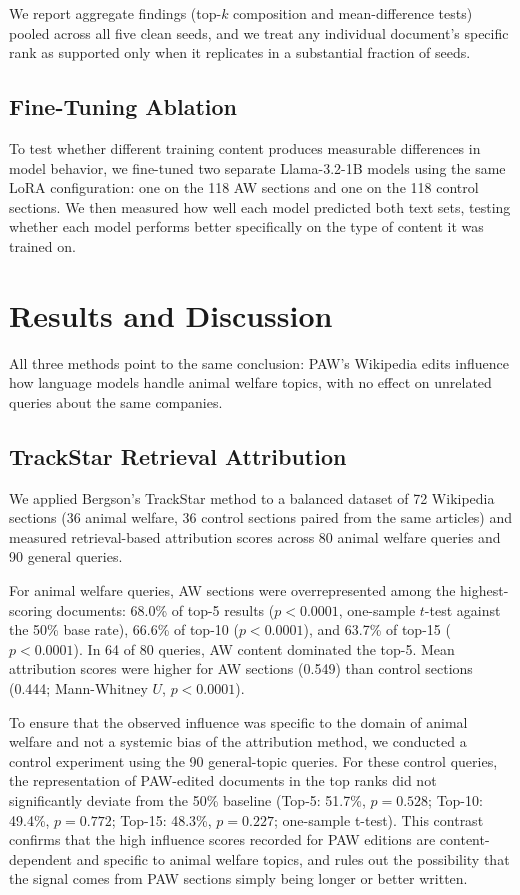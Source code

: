 \documentclass{article}
\begin{document}
We report aggregate findings (top-$k$ composition and mean-difference tests) pooled across all five clean seeds, and we treat any individual document's specific rank as supported only when it replicates in a substantial fraction of seeds.

\subsection{Fine-Tuning Ablation}

To test whether different training content produces measurable differences in model behavior, we fine-tuned two separate Llama-3.2-1B models using the same LoRA configuration: one on the 118 AW sections and one on the 118 control sections. We then measured how well each model predicted both text sets, testing whether each model performs better specifically on the type of content it was trained on.

\section{Results and Discussion}

All three methods point to the same conclusion: PAW's Wikipedia edits influence how language models handle animal welfare topics, with no effect on unrelated queries about the same companies.

\subsection{TrackStar Retrieval Attribution}

We applied Bergson's TrackStar method to a balanced dataset of 72 Wikipedia sections (36 animal welfare, 36 control sections paired from the same articles) and measured retrieval-based attribution scores across 80 animal welfare queries and 90 general queries.

For animal welfare queries, AW sections were overrepresented among the highest-scoring documents: 68.0\% of top-5 results ($p < 0.0001$, one-sample $t$-test against the 50\% base rate), 66.6\% of top-10 ($p < 0.0001$), and 63.7\% of top-15 ($p < 0.0001$). In 64 of 80 queries, AW content dominated the top-5. Mean attribution scores were higher for AW sections (0.549) than control sections (0.444; Mann-Whitney $U$, $p < 0.0001$).

To ensure that the observed influence was specific to the domain of animal welfare and not a systemic bias of the attribution method, we conducted a control experiment using the 90 general-topic queries. For these control queries, the representation of PAW-edited documents in the top ranks did not significantly deviate from the 50\% baseline (Top-5: 51.7\%, $p=0.528$; Top-10: 49.4\%, $p=0.772$; Top-15: 48.3\%, $p=0.227$; one-sample t-test). This contrast confirms that the high influence scores recorded for PAW editions are content-dependent and specific to animal welfare topics, and rules out the possibility that the signal comes from PAW sections simply being longer or better written.
\end{document}
